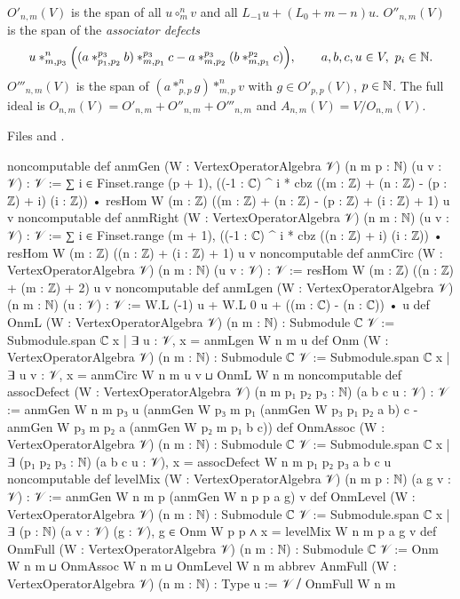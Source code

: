 \begin{definition}\label{l13:def:onm}
$O'_{n,m}(V)$ is the span of all $u\circ^n_mv$ and all $L_{-1}u+(L_0+m-n)u$. $O''_{n,m}(V)$ is the span of the
\emph{associator defects}
\begin{equation*}
 u*^n_{m,p_3}\Bigl((a*^{p_3}_{p_1,p_2}b)*^{p_3}_{m,p_1}c - a*^{p_3}_{m,p_2}(b*^{p_2}_{m,p_1}c)\Bigr),\qquad a,b,c,u\in V,\ p_i\in\N.
\end{equation*}
$O'''_{n,m}(V)$ is the span of $(a*^n_{p,p}g)*^n_{m,p}v$ with $g\in O'_{p,p}(V)$, $p\in{\mathbb{N}}$. The full ideal is
$O_{n,m}(V) = O'_{n,m}+O''_{n,m}+O'''_{n,m}$ and $A_{n,m}(V) = V/O_{n,m}(V)$.
\end{definition}
\noindent Files  and
.
\begin{leancode}
noncomputable def anmGen (W : VertexOperatorAlgebra 𝒱) (n m p : ℕ) (u v : 𝒱) : 𝒱 :=
  ∑ i ∈ Finset.range (p + 1),
    ((-1 : ℂ) ^ i * cbz ((m : ℤ) + (n : ℤ) - (p : ℤ) + i) (i : ℤ))
      • resHom W (m : ℤ) ((m : ℤ) + (n : ℤ) - (p : ℤ) + (i : ℤ) + 1) u v
noncomputable def anmRight (W : VertexOperatorAlgebra 𝒱) (n m : ℕ) (u v : 𝒱) : 𝒱 :=
  ∑ i ∈ Finset.range (m + 1),
    ((-1 : ℂ) ^ i * cbz ((n : ℤ) + i) (i : ℤ)) • resHom W (m : ℤ) ((n : ℤ) + (i : ℤ) + 1) u v
noncomputable def anmCirc (W : VertexOperatorAlgebra 𝒱) (n m : ℕ) (u v : 𝒱) : 𝒱 :=
  resHom W (m : ℤ) ((n : ℤ) + (m : ℤ) + 2) u v
noncomputable def anmLgen (W : VertexOperatorAlgebra 𝒱) (n m : ℕ) (u : 𝒱) : 𝒱 :=
  W.L (-1) u + W.L 0 u + ((m : ℂ) - (n : ℂ)) • u
def OnmL (W : VertexOperatorAlgebra 𝒱) (n m : ℕ) : Submodule ℂ 𝒱 :=
  Submodule.span ℂ {x | ∃ u : 𝒱, x = anmLgen W n m u}
def Onm (W : VertexOperatorAlgebra 𝒱) (n m : ℕ) : Submodule ℂ 𝒱 :=
  Submodule.span ℂ {x | ∃ u v : 𝒱, x = anmCirc W n m u v} ⊔ OnmL W n m
noncomputable def assocDefect (W : VertexOperatorAlgebra 𝒱) (n m p₁ p₂ p₃ : ℕ) (a b c u : 𝒱) : 𝒱 :=
  anmGen W n m p₃ u
    (anmGen W p₃ m p₁ (anmGen W p₃ p₁ p₂ a b) c
      - anmGen W p₃ m p₂ a (anmGen W p₂ m p₁ b c))
def OnmAssoc (W : VertexOperatorAlgebra 𝒱) (n m : ℕ) : Submodule ℂ 𝒱 :=
  Submodule.span ℂ
    {x | ∃ (p₁ p₂ p₃ : ℕ) (a b c u : 𝒱), x = assocDefect W n m p₁ p₂ p₃ a b c u}
noncomputable def levelMix (W : VertexOperatorAlgebra 𝒱) (n m p : ℕ) (a g v : 𝒱) : 𝒱 :=
  anmGen W n m p (anmGen W n p p a g) v
def OnmLevel (W : VertexOperatorAlgebra 𝒱) (n m : ℕ) : Submodule ℂ 𝒱 :=
  Submodule.span ℂ
    {x | ∃ (p : ℕ) (a v : 𝒱) (g : 𝒱), g ∈ Onm W p p ∧ x = levelMix W n m p a g v}
def OnmFull (W : VertexOperatorAlgebra 𝒱) (n m : ℕ) : Submodule ℂ 𝒱 :=
  Onm W n m ⊔ OnmAssoc W n m ⊔ OnmLevel W n m
abbrev AnmFull (W : VertexOperatorAlgebra 𝒱) (n m : ℕ) : Type u := 𝒱 ⧸ OnmFull W n m
\end{leancode}

